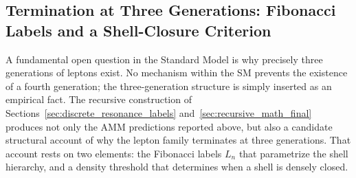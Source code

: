 \documentclass[10pt,a4paper]{article}
\begin{document}
\vspace{1em}
\noindent
\begin{center}
\end{center}
\vspace{1em}

\subsection{Termination at Three Generations: Fibonacci Labels and a Shell-Closure Criterion}
\label{sec:three_generations}
\label{sec:closure_criterion}

A fundamental open question in the Standard Model is why precisely three
generations of leptons exist. No mechanism within the SM prevents the
existence of a fourth generation; the three-generation structure is
simply inserted as an empirical fact. The recursive construction of
Sections~\ref{sec:discrete_resonance_labels}
and~\ref{sec:recursive_math_final} produces not only the AMM predictions
reported above, but also a candidate structural account of why the
lepton family terminates at three generations. That account rests on two
elements: the Fibonacci labels $L_n$ that parametrize the shell
hierarchy, and a density threshold that determines when a shell is
densely closed.
\end{document}
